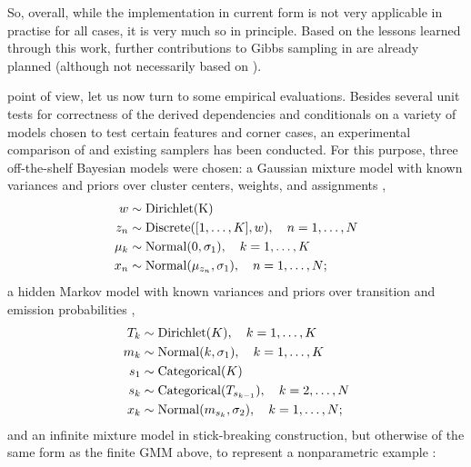 So, overall, while the implementation in current form is not very applicable in practise for all
cases, it is very much so in principle.  Based on the lessons learned through this work, further
contributions to Gibbs sampling in \turingjl{} are already planned (although not necessarily based
on \autogibbsjl{}).

 point of view, let us now turn to some empirical evaluations.
Besides several unit tests for correctness of the derived dependencies and conditionals on a variety
of models chosen to test certain features and corner cases, an experimental comparison of
\autogibbsjl{} and existing \turingjl{} samplers has been conducted.  For this purpose, three
off-the-shelf Bayesian models were chosen: a Gaussian mixture model with known variances and priors
over cluster centers, weights, and assignments \parencite[section 6.2]{marin2007bayesian},
\begin{equation}
  \label{eq:gmm}
  \begin{aligned}
    w &\sim \mathrm{Dirichlet(K)} \\
    z_{n} &\sim \mathrm{Discrete}([1, \ldots, K], w), \quad n = 1, \ldots, N \\
    \mu_{k} &\sim \mathrm{Normal}(0, \sigma_{1}), \quad k = 1, \ldots, K \\
    x_{n} &\sim \mathrm{Normal}(\mu_{z_{n}}, \sigma_{1}), \quad n = 1, \ldots, N;
  \end{aligned}
\end{equation}
a hidden Markov model with known variances and priors over transition and emission
probabilities \parencite[section 7.3]{marin2007bayesian},
\begin{equation}
  \label{eq:hmm}
  \begin{aligned}
    T_{k} &\sim \mathrm{Dirichlet}(K), \quad k = 1, \ldots, K \\
    m_{k} &\sim \mathrm{Normal}(k, \sigma_{1}), \quad k = 1, \ldots, K \\
    s_{1} &\sim \mathrm{Categorical}(K) \\
    s_{k} &\sim \mathrm{Categorical}(T_{s_{k-1}}), \quad k = 2, \ldots, N \\
    x_{k} &\sim \mathrm{Normal}(m_{s_{k}}, \sigma_{2}), \quad k = 1, \ldots, N;
  \end{aligned}
\end{equation}
and an infinite mixture model in stick-breaking construction, but otherwise of the same form as the
finite GMM above, to represent a nonparametric example \parencite[section 2.2]{hjort2010bayesian}:
